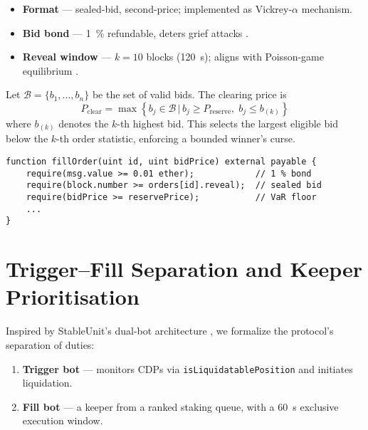 \documentclass[11pt]{article}
\begin{document}
\begin{itemize}[leftmargin=*]
\item \textbf{Format} — sealed-bid, second-price; implemented as Vickrey-$\alpha$ mechanism.
\item \textbf{Bid bond} — \SI{1}{\percent} refundable, deters grief attacks \parencite{tian2025defi}.
\item \textbf{Reveal window} — $k{=}10$ blocks (\SI{120}{\second}); aligns with Poisson-game equilibrium \parencite{meroni2017games}.
\end{itemize}

Let $\mathcal{B} = \{b_1, \dots, b_n\}$ be the set of valid bids. The clearing price is
\[
P_{\text{clear}} = \max\left\{ b_j \in \mathcal{B} \,|\, b_j \geq P_{\text{reserve}},\; b_j \leq b_{(k)} \right\}
\]
where $b_{(k)}$ denotes the $k$-th highest bid. This selects the largest eligible bid below the $k$-th order statistic, enforcing a bounded winner's curse.

\begin{listing}[htbp]
\begin{lstlisting}[caption={Solidity pseudo-code: auction guard}]
function fillOrder(uint id, uint bidPrice) external payable {
    require(msg.value >= 0.01 ether);            // 1 % bond
    require(block.number >= orders[id].reveal);  // sealed bid
    require(bidPrice >= reservePrice);           // VaR floor
    ...
}
\end{lstlisting}
\end{listing}

\section{Trigger–Fill Separation and Keeper Prioritisation}
\label{sec:bots}
Inspired by StableUnit’s dual-bot architecture \parencite{stableunit2025spec}, we formalize the protocol's separation of duties:

\begin{enumerate}[label=\textbf{\arabic*.},wide, labelindent=0pt]
  \item \textbf{Trigger bot} — monitors CDPs via \texttt{isLiquidatablePosition} and initiates liquidation.
  \item \textbf{Fill bot} — a keeper from a ranked staking queue, with a \SI{60}{\second} exclusive execution window.
\end{enumerate}
\end{document}
